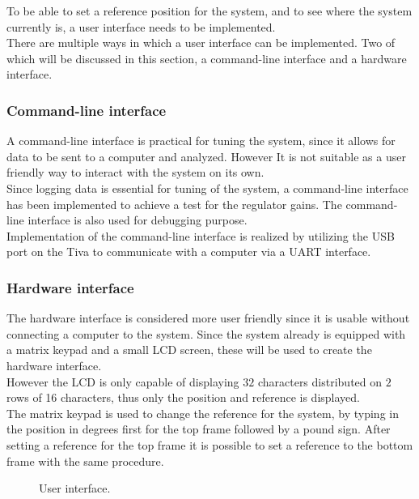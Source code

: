 \documentclass[../../../main]{subfiles}
\begin{document}
To be able to set a reference position for the system, and to see where the system currently is, a user interface needs to be implemented.\\
There are multiple ways in which a user interface can be implemented.
Two of which will be discussed in this section, a command-line interface and a hardware interface.

\subsubsection{Command-line interface}%
\label{ssub:command-line_interface}
A command-line interface is practical for tuning the system, since it allows for data to be sent to a computer and analyzed.
However It is not suitable as a user friendly way to interact with the system on its own.
\\
Since logging data is essential for tuning of the system, a command-line interface has been implemented to achieve a test for the regulator gains.
The command-line interface is also used for debugging purpose.
\\
Implementation of the command-line interface is realized by utilizing the USB port on the Tiva to communicate with a computer via a UART interface.

\subsubsection{Hardware interface}%
\label{ssub:hardware_interface}
The hardware interface is considered more user friendly since it is usable without connecting a computer to the system.
Since the system already is equipped with a matrix keypad and a small LCD screen, these will be used to create the hardware interface.
\\
However the LCD is only capable of displaying $32$ characters distributed on $2$ rows of 16 characters, thus only the position and reference is displayed.
\\
The matrix keypad is used to change the reference for the system, by typing in the position in degrees first for the top frame followed by a pound sign. 
After setting a reference for the top frame it is possible to set a reference to the bottom frame with the same procedure. 

\begin{figure}[H]
  \centering
  \def\svgwidth{\textwidth}
  
  \caption{User interface.}
  \label{fig:User_interface}
\end{figure}
\end{document}
